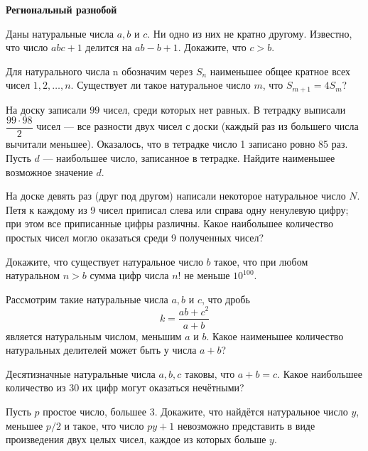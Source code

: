 \documentclass{article}
\begin{document}
    \large

    \begin{center}
        \textbf{Региональный разнобой}
    \end{center}


    \begin{enumerate_boxed}

        \item Даны натуральные числа $a, b$ и $c$.
        Ни одно из них не кратно другому.
        Известно, что число $abc + 1$ делится на $ab - b + 1$.
        Докажите, что $c > b$.

        \item Для натурального числа n обозначим через $S_n$ наименьшее общее кратное всех чисел $1, 2, \dotsc , n$.
        Существует ли такое натуральное число $m$, что $S_{m+1} = 4S_m$?

        \item  На доску записали $99$ чисел, среди которых нет равных.
        В тетрадку выписали $\dfrac{99 \cdot 98}{2}$ чисел — все разности двух чисел с доски (каждый раз из большего числа вычитали меньшее).
        Оказалось, что в тетрадке число 1 записано ровно 85 раз.
        Пусть $d$ — наибольшее число, записанное в тетрадке.
        Найдите наименьшее возможное значение $d$.

        \item На доске девять раз (друг под другом) написали некоторое натуральное число $N$.
        Петя к каждому из 9 чисел приписал слева или справа одну ненулевую цифру; при этом все приписанные цифры различны.
        Какое наибольшее количество простых чисел могло оказаться среди 9 полученных чисел?

        \item Докажите, что существует натуральное число $b$ такое, что при любом натуральном $n > b$ сумма цифр числа $n!$ не меньше $10^{100}$.

        \item Рассмотрим такие натуральные числа $a, b$ и $c$, что дробь \[k = \frac{ab+c^2}{a + b}\] является натуральным числом, меньшим $a$ и $b$.
        Какое наименьшее количество натуральных делителей может быть у числа $a + b$?

        \item Десятизначные натуральные числа $a, b, c$ таковы, что $a + b = c$.
        Какое наибольшее количество из 30 их цифр могут оказаться нечётными?

        \item Пусть $p$ простое число, большее 3.
        Докажите, что найдётся натуральное число $y$, меньшее $p/2$ и такое, что число $py + 1$ невозможно представить в виде произведения двух целых чисел, каждое из которых больше $y$.


    \end{enumerate_boxed}
\end{document}
